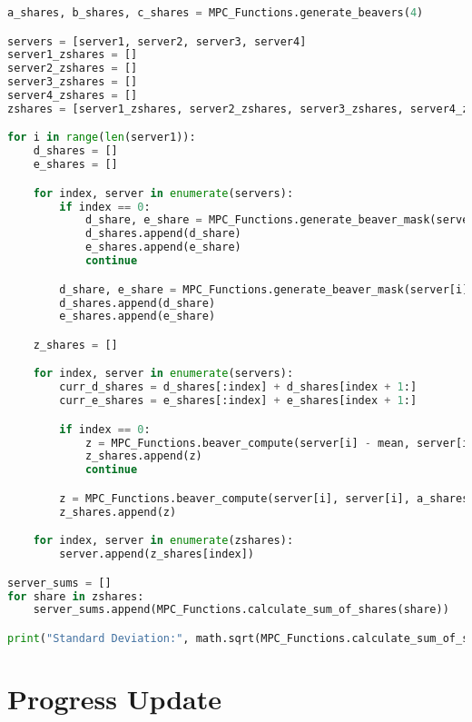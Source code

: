 \documentclass[conference]{IEEEtran}
\begin{document}
\begin{lstlisting}[language=Python, caption={Sample MPC Implementation Using Beaver's Triples}, label={lst:mpc_code}]
a_shares, b_shares, c_shares = MPC_Functions.generate_beavers(4)

servers = [server1, server2, server3, server4]
server1_zshares = []
server2_zshares = []
server3_zshares = []
server4_zshares = []
zshares = [server1_zshares, server2_zshares, server3_zshares, server4_zshares]

for i in range(len(server1)):
    d_shares = []
    e_shares = []

    for index, server in enumerate(servers):
        if index == 0:
            d_share, e_share = MPC_Functions.generate_beaver_mask(server[i] - mean, server[i] - mean, a_shares[index], b_shares[index])
            d_shares.append(d_share)
            e_shares.append(e_share)
            continue

        d_share, e_share = MPC_Functions.generate_beaver_mask(server[i], server[i], a_shares[index], b_shares[index])
        d_shares.append(d_share)
        e_shares.append(e_share)

    z_shares = []

    for index, server in enumerate(servers):
        curr_d_shares = d_shares[:index] + d_shares[index + 1:]
        curr_e_shares = e_shares[:index] + e_shares[index + 1:]

        if index == 0:
            z = MPC_Functions.beaver_compute(server[i] - mean, server[i] - mean, a_shares[index], b_shares[index], c_shares[index], curr_d_shares, curr_e_shares, True)
            z_shares.append(z)
            continue

        z = MPC_Functions.beaver_compute(server[i], server[i], a_shares[index], b_shares[index], c_shares[index], curr_d_shares, curr_e_shares)
        z_shares.append(z)

    for index, server in enumerate(zshares):
        server.append(z_shares[index])

server_sums = []
for share in zshares:
    server_sums.append(MPC_Functions.calculate_sum_of_shares(share))

print("Standard Deviation:", math.sqrt(MPC_Functions.calculate_sum_of_shares(server_sums)/len(message_shares)))
\end{lstlisting}


\section{Progress Update}
\end{document}
